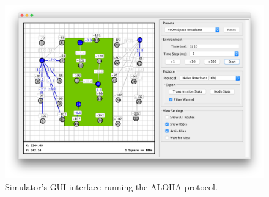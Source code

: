 \begin{figure}[H]
    \centering
   	\includegraphics[width=\textwidth]{Figures/simulator_main}
    \caption[Simulator GUI example]{ 
    	Simulator's GUI interface running the ALOHA protocol.
    	}
    \label{fig:sim_interface_main}
\end{figure}





